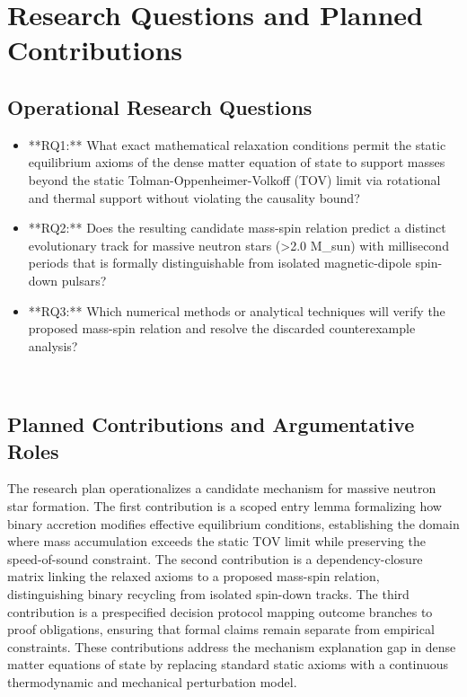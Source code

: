\documentclass[conference]{IEEEtran}
\begin{document}
\section{Research Questions and Planned Contributions}
\subsection{Operational Research Questions}
\begin{itemize}
\item **RQ1:** What exact mathematical relaxation conditions permit the static equilibrium axioms of the dense matter equation of state to support masses beyond the static Tolman-Oppenheimer-Volkoff (TOV) limit via rotational and thermal support without violating the causality bound?
\item **RQ2:** Does the resulting candidate mass-spin relation predict a distinct evolutionary track for massive neutron stars (>2.0 M\_sun) with millisecond periods that is formally distinguishable from isolated magnetic-dipole spin-down pulsars?
\item **RQ3:** Which numerical methods or analytical techniques will verify the proposed mass-spin relation and resolve the discarded counterexample analysis?
\end{itemize}~\cite{cite_42e341ff6471ce89,cite_a50fdc75b0400b49}

\subsection{Planned Contributions and Argumentative Roles}
The research plan operationalizes a candidate mechanism for massive neutron star formation. The first contribution is a scoped entry lemma formalizing how binary accretion modifies effective equilibrium conditions, establishing the domain where mass accumulation exceeds the static TOV limit while preserving the speed-of-sound constraint. The second contribution is a dependency-closure matrix linking the relaxed axioms to a proposed mass-spin relation, distinguishing binary recycling from isolated spin-down tracks. The third contribution is a prespecified decision protocol mapping outcome branches to proof obligations, ensuring that formal claims remain separate from empirical constraints. These contributions address the mechanism explanation gap in dense matter equations of state by replacing standard static axioms with a continuous thermodynamic and mechanical perturbation model.~\cite{cite_55957f4ce67bd972,cite_1e5d552669fc0c56,cite_c369df652181e8f7}
\end{document}
